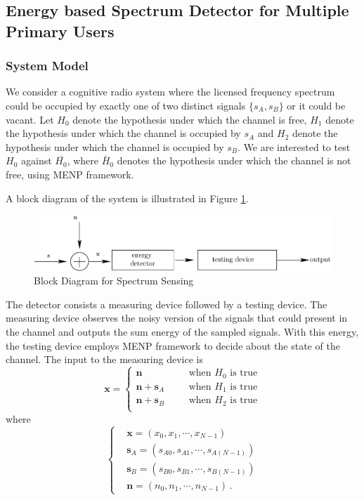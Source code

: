 \subsection{Energy based Spectrum Detector for Multiple Primary Users}
\subsubsection{System Model}
We consider a cognitive radio system where the licensed frequency spectrum could be occupied by exactly one of two distinct signals $\{s_A, s_B\}$ or it could be vacant. Let $H_0$ denote the hypothesis under which the channel is free, ${H}_1$ denote the hypothesis under which the channel is occupied by $s_A$ and ${H}_2$ denote the hypothesis under which the channel is occupied by $s_B$. We are interested to test $H_0$ against $\bar{{H}_0}$, where $\bar{H}_0$ denotes the hypothesis under which the channel is not free, using MENP framework.

A block diagram of the system is illustrated in Figure \ref{pic: block diagram}.

\begin{figure}[!hbp]
\centering
\includegraphics[width = \textwidth]{4/fig4.eps}
\caption{Block Diagram for Spectrum Sensing}
\label{pic: block diagram}
\end{figure}

The detector consists a measuring device followed by a testing device. 
The measuring device observes the noisy version of the signals that could present in the channel and outputs the sum energy of the sampled signals.
With this energy, the testing device employs MENP framework to decide about the state of the channel.
The input to the measuring device is 
\begin{equation}
  \mathbf{x} = \begin{cases}
	\mathbf{n}\;\;\;\;\;\;&\text{when $H_0$ is true}\\
	\mathbf{n}+\mathbf{s}_A\;\;\;\;\;\;&\text{when $H_1$ is true}\\
	\mathbf{n}+\mathbf{s}_B\;\;\;\;\;\;&\text{when $H_2$ is true}\\
  \end{cases}
  \label{equ:1222n0}
\end{equation}
where 
\begin{equation}
  \begin{cases}
	&\mathbf{x} = (x_0, x_1, \cdots, x_{N-1})\\
	&\mathbf{s}_A = (s_{A0}, s_{A1}, \cdots, s_{A(N-1)})\\
	&\mathbf{s}_B = (s_{B0}, s_{B1}, \cdots, s_{B(N-1)})\\
	&\mathbf{n} = (n_{0}, n_{1}, \cdots, n_{N-1})\,.
  \end{cases}
  \label{1222n1}
\end{equation}

